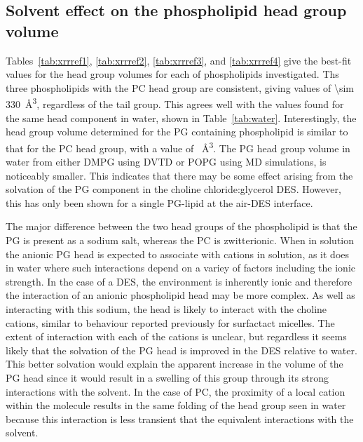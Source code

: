 \subsection{Solvent effect on the phospholipid head group volume}
Tables~\ref{tab:xrrref1}, \ref{tab:xrrref2}, \ref{tab:xrrref3}, and \ref{tab:xrrref4} give the best-fit values for the head group volumes for each of phospholipids investigated.
Ths three phospholipids with the PC head group are consistent, giving values of \SI{\sim 330}{\angstrom\cubed}, regardless of the tail group.
This agrees well with the values found for the same head component in water, shown in Table~\ref{tab:water}.
Interestingly, the head group volume determined for the PG containing phospholipid is similar to that for the PC head group, with a value of ~\si{\angstrom\cubed}.
The PG head group volume in water from either DMPG using DVTD\autocite{pan_molecular_2012} or POPG using MD simulations,\autocite{kucerka_scattering_2012} is noticeably smaller.
This indicates that there may be some effect arising from the solvation of the PG component in the choline chloride:glycerol DES.
However, this has only been shown for a single PG-lipid at the air-DES interface.

The major difference between the two head groups of the phospholipid is that the PG is present as a sodium salt, whereas the PC is zwitterionic.
When in solution the anionic PG head is expected to associate with cations in solution, as it does in water\autocite{grigoriev_effect_1999} where such interactions depend on a variey of factors including the ionic strength.
In the case of a DES, the environment is inherently ionic and therefore the interaction of an anionic phospholipid head may be more complex.
As well as interacting with this sodium, the head is likely to interact with the choline cations, similar to behaviour reported previously for surfactact micelles.\autocite{sanchez-fernandez_counterion_2018}
The extent of interaction with each of the cations is unclear, but regardless it seems likely that the solvation of the PG head is improved in the DES relative to water.
This better solvation would explain the apparent increase in the volume of the PG head since it would result in a swelling of this group through its strong interactions with the solvent.
In the case of PC, the proximity of a local cation within the molecule results in the same folding of the head group seen in water because this interaction is less transient that the equivalent interactions with the solvent.

